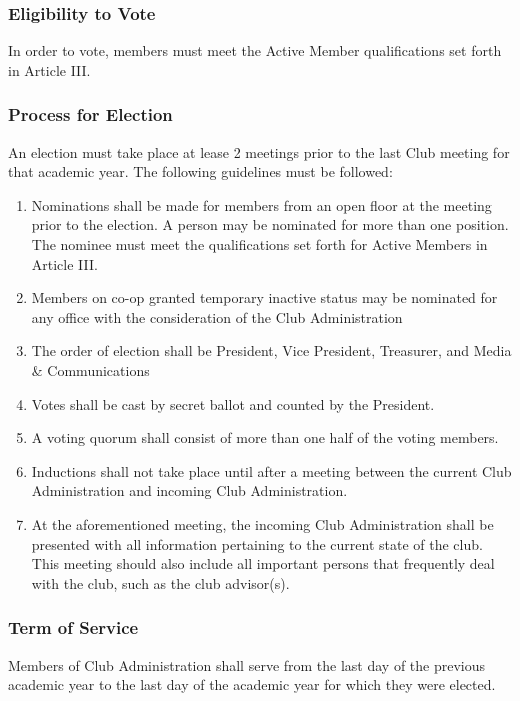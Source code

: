 \documentclass[english,11pt]{article}
\begin{document}
\subsubsection{Eligibility to Vote}
In order to vote, members must meet the Active Member qualifications set forth in Article III.

\subsubsection{Process for Election}
An election must take place at lease 2 meetings prior to the last Club meeting for that academic year. The following guidelines must be followed:

\begin{enumerate}[label=\alph*.]
\item Nominations shall be made for members from an open floor at the meeting prior to the election.
      A person may be nominated for more than one position. The nominee must meet the qualifications set forth for Active Members in Article III.
\item Members on co-op granted temporary inactive status may be nominated for any office with the consideration of the Club Administration
\item The order of election shall be President, Vice President, Treasurer, and Media \& Communications
\item Votes shall be cast by secret ballot and counted by the President.
\item A voting quorum shall consist of more than one half of the voting members.
\item Inductions shall not take place until after a meeting between the current Club Administration and incoming Club Administration.
\item At the aforementioned meeting, the incoming Club Administration shall be presented with all information pertaining to the current state of the club. 
      This meeting should also include all important persons that frequently deal with the club, such as the club advisor(s).
\end{enumerate}

\subsubsection{Term of Service}
Members of Club Administration shall serve from the last day of the previous academic year to the last day of the academic year for which they were elected.
\end{document}
